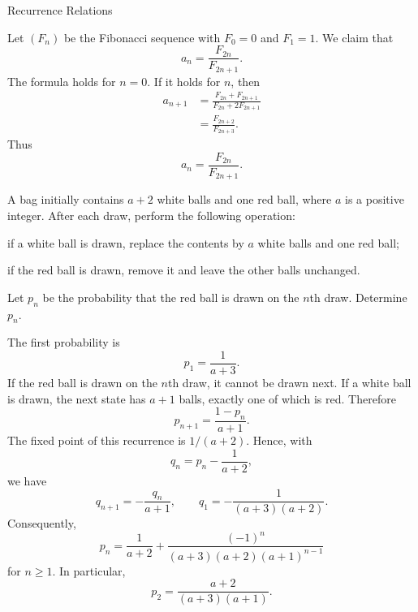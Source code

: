 \begin{expectedproblemgroup}{Recurrence Relations}
        \begin{expectedsubsolution}
            Let $(F_n)$ be the Fibonacci sequence with $F_0=0$ and $F_1=1$. We
            claim that
            \[
                a_n=\frac{F_{2n}}{F_{2n+1}}.
            \]
            The formula holds for $n=0$. If it holds for $n$, then
            \[
                \begin{aligned}
                    a_{n+1}
                    &=
                    \frac{F_{2n}+F_{2n+1}}
                    {F_{2n}+2F_{2n+1}}\\
                    &=
                    \frac{F_{2n+2}}{F_{2n+3}}.
                \end{aligned}
            \]
            Thus
            \[
                \boxed{a_n=\frac{F_{2n}}{F_{2n+1}}}.
            \]
        \end{expectedsubsolution}

        \begin{expectedsubproblem}
            A bag initially contains $a+2$ white balls and one red ball, where
            $a$ is a positive integer. After each draw, perform the following
            operation:
            \begin{problemchoices}
                \item if a white ball is drawn, replace the contents by $a$
                white balls and one red ball;
                \item if the red ball is drawn, remove it and leave the other
                balls unchanged.
            \end{problemchoices}
            Let $p_n$ be the probability that the red ball is drawn on the
            $n$th draw. Determine $p_n$.
        \end{expectedsubproblem}

        \begin{expectedsubsolution}
            The first probability is
            \[
                p_1=\frac{1}{a+3}.
            \]
            If the red ball is drawn on the $n$th draw, it cannot be drawn next. If
            a white ball is drawn, the next state has $a+1$ balls, exactly one of
            which is red. Therefore
            \[
                p_{n+1}=\frac{1-p_n}{a+1}.
            \]
            The fixed point of this recurrence is $1/(a+2)$. Hence, with
            \[
                q_n=p_n-\frac{1}{a+2},
            \]
            we have
            \[
                q_{n+1}=-\frac{q_n}{a+1},
                \qquad
                q_1=-\frac{1}{(a+3)(a+2)}.
            \]
            Consequently,
            \[
                \boxed{
                    p_n
                    =
                    \frac{1}{a+2}
                    +
                    \frac{(-1)^n}{
                        (a+3)(a+2)(a+1)^{n-1}
                    }
                }
            \]
            for $n\geq1$. In particular,
            \[
                p_2=\frac{a+2}{(a+3)(a+1)}.
            \]
        \end{expectedsubsolution}

    \end{expectedproblemgroup}

